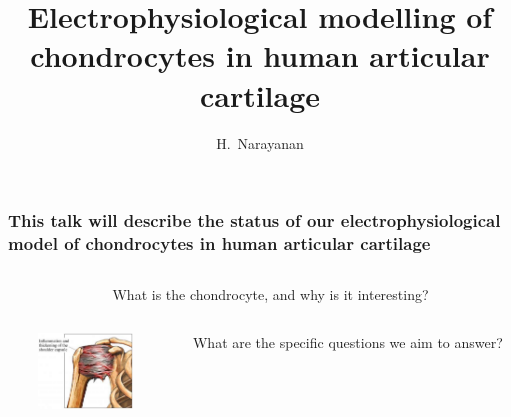 \documentclass[ignorenonframetext]{beamer}
\title{Electrophysiological modelling of chondrocytes in human
  articular cartilage}
\author{H.~Narayanan}
\institute[]{}
\date[]{}
\begin{document}
%
%
%


\begin{frame}
  \frametitle{This talk will describe the status of our
    electrophysiological model of chondrocytes in human articular
    cartilage}
  \begin{columns}
    \begin{column}{3cm}
    \end{column}
    \begin{column}{9cm}
      What is the chondrocyte, and why is it interesting?
    \end{column}
  \end{columns}
  \vspace{0.3cm}
  \begin{columns}
    \begin{column}{1cm}
    \end{column}
    \begin{column}{2.5cm}
      \includegraphics[width=2.5cm]{../images/pdf/frozen-shoulder}
    \end{column}
    \begin{column}{0.1cm}
    \end{column}
    \begin{column}{8.5cm}
      What are the specific questions we aim to answer?
    \end{column}
  \end{columns}
  \vspace{0.3cm}
  \begin{columns}

\end{columns}
\end{frame}
\end{document}
